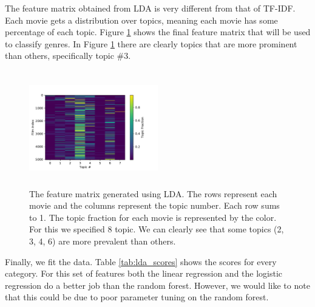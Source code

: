\documentclass[11pt]{article}
\begin{document}
The feature matrix obtained from LDA is very different from that of TF-IDF. Each movie gets a distribution over topics, meaning each movie has some percentage of each topic. Figure \ref{fig:lda} shows the final feature matrix that will be used to classify genres. In Figure \ref{fig:lda} there are clearly topics that are more prominent than others, specifically topic \#3.  

\begin{figure}[ht]
	\centering
		\includegraphics[width=0.5\textwidth,height=5cm]{lda_features.pdf}
	\caption{The feature matrix generated using LDA. The rows represent each movie and the columns represent the topic number. Each row sums to 1. The topic fraction for each movie is represented by the color. For this we specified 8 topic. We can clearly see that some topics (2, 3, 4, 6) are more prevalent than others.}
	\label{fig:lda}
\end{figure}

Finally, we fit the data. Table \ref{tab:lda_scores} shows the scores for every category. For this set of features both the linear regression and the logistic regression do a better job than the random forest. However, we would like to note that this could be due to poor parameter tuning on the random forest.
\end{document}
